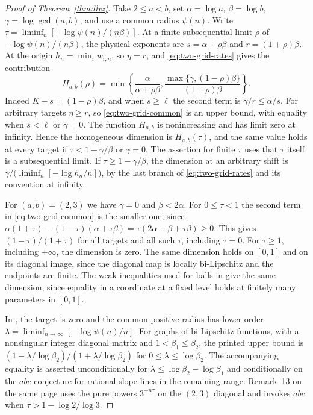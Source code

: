 \documentclass[11pt,reqno,a4paper]{amsart}
\theoremstyle{remark}
\numberwithin{equation}{section}
\begin{document}
\begin{proof}[Proof of Theorem~\ref{thm:llvz}]
Take \(2\le a<b\), set
\(\alpha=\log a\), \(\beta=\log b\), \(\gamma=\log\gcd(a,b)\),
and use a common radius \(\psi(n)\). Write
\(\tau=\liminf_n[-\log\psi(n)/(n\beta)]\).
At a finite subsequential limit \(\rho\) of
\(-\log\psi(n)/(n\beta)\), the physical exponents are
\(s=\alpha+\rho\beta\) and \(r=(1+\rho)\beta\).
At the origin \(h_n=\min_i w_{i,n}\), so \(\eta=r\), and
\eqref{eq:two-grid-rates} gives the contribution
\begin{equation}\label{eq:two-grid-common}
  H_{a,b}(\rho)=
  \min\!\left\{\frac{\alpha}{\alpha+\rho\beta},
     \frac{\max\{\gamma,(1-\rho)\beta\}}{(1+\rho)\beta}\right\}.
\end{equation}
Indeed \(K-s=(1-\rho)\beta\), and when \(s\ge\ell\)
the second term is \(\gamma/r\le\alpha/s\).
For arbitrary targets \(\eta\ge r\), so \eqref{eq:two-grid-common}
is an upper bound, with equality when \(s<\ell\) or \(\gamma=0\).
The function \(H_{a,b}\) is nonincreasing and has limit zero at
infinity. Hence the homogeneous dimension is \(H_{a,b}(\tau)\),
and the same value holds at every target if \(\tau<1-\gamma/\beta\)
or \(\gamma=0\). The assertion for finite \(\tau\) uses that
\(\tau\) itself is a subsequential limit. If \(\tau\ge1-\gamma/\beta\),
the dimension at an arbitrary shift is
\(\gamma/\bigl(\liminf_n[-\log h_n/n]\bigr)\), by the last branch
of \eqref{eq:two-grid-rates} and its convention at infinity.

For \((a,b)=(2,3)\) we have \(\gamma=0\) and \(\beta<2\alpha\).
For \(0\le\tau<1\) the second term in \eqref{eq:two-grid-common}
is the smaller one, since
\(\alpha(1+\tau)-(1-\tau)(\alpha+\tau\beta)
=\tau(2\alpha-\beta+\tau\beta)\ge0\).
This gives \((1-\tau)/(1+\tau)\) for all targets and all such
\(\tau\), including \(\tau=0\). For
\(\tau\ge1\), including \(+\infty\), the dimension is zero.
The same dimension holds on \([0,1]\) and on its diagonal image,
since the diagonal map is locally bi-Lipschitz and the endpoints
are finite. The weak inequalities used for balls in \cite[p.~9, Remark~4]{LLVZ}
give the same dimension, since equality in a coordinate at a
fixed level holds at finitely many parameters in \([0,1]\).

In \cite[\S\,5.5, p.~67, Eq.~(75)]{LLVZ}, the target is zero and
the common positive radius has lower order
\(\lambda=\liminf_{n\to\infty}[-\log\psi(n)/n]\). For graphs of bi-Lipschitz
functions, with a nonsingular integer diagonal matrix and
\(1<\beta_1\le\beta_2\), the printed upper bound is
\((1-\lambda/\log\beta_2)/(1+\lambda/\log\beta_2)\) for
\(0\le\lambda\le\log\beta_2\). The accompanying equality is asserted
unconditionally for \(\lambda\le\log\beta_2-\log\beta_1\) and
conditionally on the \(abc\) conjecture for rational-slope lines in
the remaining range. Remark~13 on the same page uses the pure powers
\(3^{-n\tau}\) on the \((2,3)\) diagonal and invokes \(abc\) when
\(\tau>1-\log2/\log3\).


\end{proof}
\end{document}
